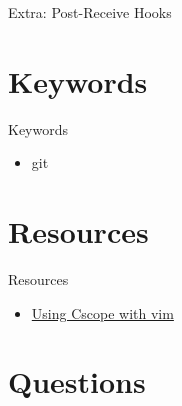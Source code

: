 \documentclass{workshop}
\begin{document}
\begin{frame}{Extra: Post-Receive Hooks}
\end{frame}

\section{Keywords}

\begin{frame}{Keywords}
     \begin{itemize}
	\item git
      \end{itemize}
\end{frame}

\section{Resources}
\begin{frame}{Resources}
  \begin{itemize}
  \item \href{http://cscope.sourceforge.net/cscope_vim_tutorial.html}{Using Cscope with vim}
  \end{itemize}
\end{frame}

\section{Questions}
\end{document}
